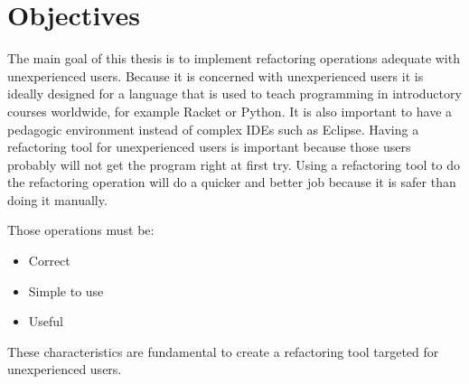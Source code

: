 
% 
% 

\section{Objectives}





The main goal of this thesis is to implement refactoring operations adequate with unexperienced users.
Because it is concerned with unexperienced users it is ideally designed for a language that is used to teach programming in introductory courses worldwide, for example Racket or Python.
It is also important to have a pedagogic environment instead of complex IDEs such as Eclipse.
Having a refactoring tool for unexperienced users is important because those users probably will not get the program right at first try.
Using a refactoring tool to do the refactoring operation will do a quicker and better job because it is safer than doing it manually.

Those operations must be:
\begin{itemize}
\item Correct
\item Simple to use
\item Useful
\end{itemize}

These characteristics are fundamental to create a refactoring tool targeted for unexperienced users.